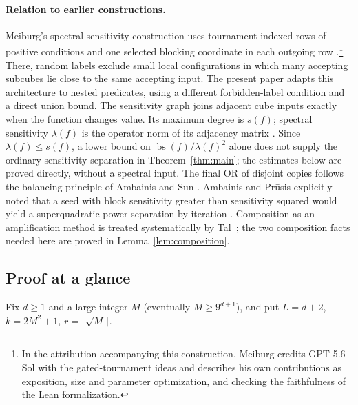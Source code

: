 \documentclass[11pt]{article}
\newcommand{\bs}{\operatorname{bs}}
\theoremstyle{definition}
\theoremstyle{remark}
\begin{document}
\paragraph{Relation to earlier constructions.}
Meiburg's spectral-sensitivity construction uses tournament-indexed rows
of positive conditions and one selected blocking coordinate in each
outgoing row \cite[Sections~3.1 and~5.2--5.5]{Meiburg2026}.\footnote{In the
attribution accompanying this construction, Meiburg credits GPT-5.6-Sol
with the gated-tournament ideas and describes his own contributions as
exposition, size and parameter optimization, and checking the faithfulness
of the Lean formalization.}
There, random labels exclude small local configurations in which many accepting
subcubes lie close to the same accepting input. The present paper adapts this architecture
to nested predicates, using a different forbidden-label condition and a
direct union bound.
The sensitivity graph joins adjacent cube inputs exactly when the function
changes value. Its maximum degree is \(s(f)\); spectral sensitivity
\(\lambda(f)\) is the operator norm of its adjacency matrix
\cite{AaronsonEtAl2021}.
Since \(\lambda(f)\le s(f)\), a lower bound on
\(\bs(f)/\lambda(f)^2\) alone does not supply the ordinary-sensitivity
separation in Theorem~\ref{thm:main}; the estimates below are proved directly, without a spectral input.
The final OR of disjoint copies follows the balancing principle of Ambainis and Sun
\cite[Section~4, Lemma~1]{AmbainisSun2011}.
Ambainis and Pr\={u}sis explicitly
noted that a seed with block sensitivity greater than sensitivity squared
would yield a superquadratic power separation by iteration
\cite[Section~1]{AmbainisPrusis2014}. Composition as an amplification method
is treated systematically by Tal~\cite{Tal2013}; the two composition facts needed here are proved in Lemma~\ref{lem:composition}.

\subsection{Proof at a glance}
\label{sec:glance}

Fix \(d\ge1\) and a large integer \(M\) (eventually \(M\ge9^{d+1}\)), and put \(L=d+2\), \(k=2M^2+1\), \(r=\lceil\sqrt M\rceil\).
\end{document}
